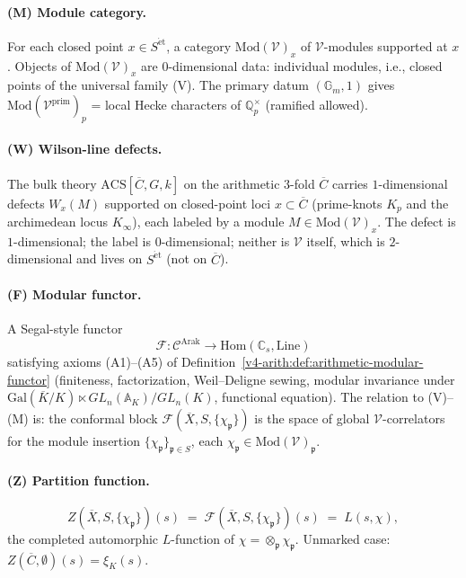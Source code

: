 \begin{definition}
\paragraph{(M) Module category.} For each closed point
\(x\in S^{\mathrm{\acute{e}t}}\), a category \(\mathrm{Mod}(\mathcal{V})_{x}\)
of \(\mathcal{V}\)-modules supported at \(x\). Objects of
\(\mathrm{Mod}(\mathcal{V})_{x}\) are \(0\)-dimensional data: individual
modules, i.e., closed points of the universal family (V). The
primary datum \((\mathbb{G}_{m},1)\) gives
\(\mathrm{Mod}(\mathcal{V}^{\mathrm{prim}})_{p}\) = local Hecke
characters of \(\mathbb{Q}_{p}^{\times}\) (ramified allowed).

\paragraph{(W) Wilson-line defects.} The bulk theory
\(\mathrm{ACS}[\overline{C},G,k]\) on the arithmetic \(3\)-fold
\(\overline{C}\) carries \(1\)-dimensional defects \(W_{x}(M)\) supported
on closed-point loci \(x\subset\overline{C}\) (prime-knots
\(K_{p}\) and the archimedean locus \(K_{\infty}\)), each labeled by
a module \(M\in\mathrm{Mod}(\mathcal{V})_{x}\). The defect is
\(1\)-dimensional; the label is \(0\)-dimensional; neither is
\(\mathcal{V}\) itself, which is \(2\)-dimensional and lives on
\(S^{\mathrm{\acute{e}t}}\) (not on \(\overline{C}\)).

\paragraph{(F) Modular functor.} A Segal-style functor
\begin{equation*}
\mathcal{F}\colon\mathcal{C}^{\mathrm{Arak}}\to\mathrm{Hom}(\mathbb{C}_{s},\mathrm{Line})
\end{equation*}
satisfying axioms (A1)--(A5) of
Definition~\ref{v4-arith:def:arithmetic-modular-functor} (finiteness,
factorization, Weil--Deligne sewing, modular invariance under
\(\mathrm{Gal}(\overline{K}/K)\ltimes GL_{n}(\mathbb{A}_{K})/GL_{n}(K)\),
functional equation). The relation to (V)--(M) is: the conformal
block \(\mathcal{F}(\overline{X},S,\{\chi_{\mathfrak{p}}\})\) is the
space of global \(\mathcal{V}\)-correlators for the module insertion
\(\{\chi_{\mathfrak{p}}\}_{\mathfrak{p}\in S}\), each \(\chi_{\mathfrak{p}}\in\mathrm{Mod}(\mathcal{V})_{\mathfrak{p}}\).

\paragraph{(Z) Partition function.}
\begin{equation*}
Z(\overline{X},S,\{\chi_{\mathfrak{p}}\})(s)\;=\;\mathcal{F}(\overline{X},S,\{\chi_{\mathfrak{p}}\})(s)\;=\;L(s,\chi),
\end{equation*}
the completed automorphic \(L\)-function of \(\chi=\otimes_{\mathfrak{p}}\chi_{\mathfrak{p}}\).
Unmarked case: \(Z(\overline{C},\emptyset)(s)=\xi_{K}(s)\).


\end{definition}
